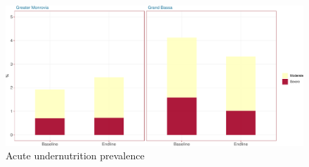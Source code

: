 \documentclass[12pt,a4paper]{article}
\begin{document}
\begin{figure}[H]

{\centering \includegraphics{liberiaCoverageFinalReport_files/figure-latex/nut1plot-1} 

}

\caption{Acute undernutrition prevalence}\label{fig:nut1plot}
\end{figure}
\end{document}
